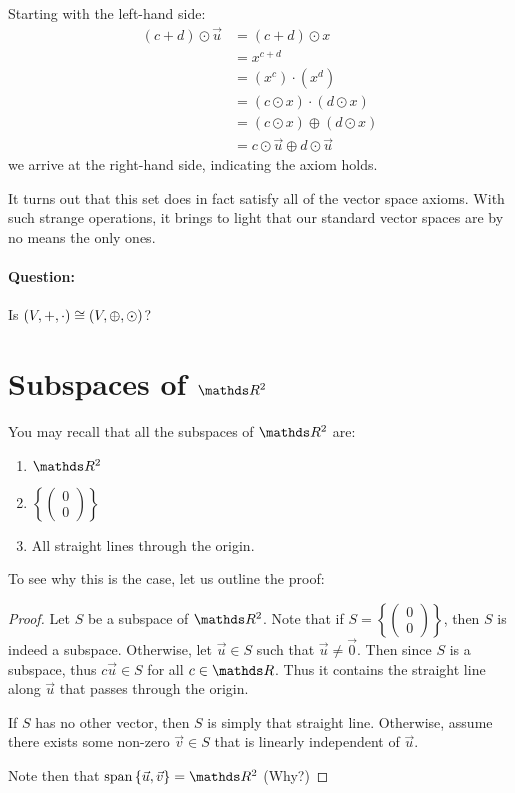 \documentclass[11pt]{article}
\newcommand{\ques}{\paragraph{Question:}}
\newcommand{\vek}[1]{\vec{#1}}
\begin{document}
\begin{enumerate}
{Starting with the left-hand side:
\begin{align*}
(c+d) \odot \vek{u} &= (c+d) \odot x
\\
&= x^{c+d}
\\
&= (x^c) \cdot (x^d)
\\
&= (c \odot x) \cdot (d \odot x)
\\
&= (c \odot x) \oplus (d \odot x)
\\
&= c \odot \vek{u} \oplus d \odot \vek{u}
\end{align*}
we arrive at the right-hand side, indicating the axiom holds.
}
\end{enumerate}
It turns out that this set does in fact satisfy all of the vector space axioms. With such strange operations, it brings to light that our standard vector spaces are by no means the only ones.
\ques Is $(V,+,\cdot) \cong (V, \oplus, \odot)$?

\section*{Subspaces of $\bbR^2$}
You may recall that all the subspaces of $\bbR^2$ are:
\begin{enumerate}
\item{
$\bbR^2$
}
\item{
$\left\{ \begin{pmatrix}0 \\ 0\end{pmatrix} \right\}$
}
\item{
All straight lines through the origin.
}
\end{enumerate}
To see why this is the case, let us outline the proof:
\begin{proof}
Let $S$ be a subspace of $\bbR^2$. Note that if $S = \left\{ \begin{pmatrix}0 \\ 0\end{pmatrix}\right\}$, then $S$ is indeed a subspace. Otherwise, let $\vek{u} \in S$ such that $\vek{u} \neq \vek{0}$. Then since $S$ is a subspace, thus $c \vek{u} \in S$ for all $c \in \bbR$. Thus it contains the straight line along $\vek{u}$ that passes through the origin.

If $S$ has no other vector, then $S$ is simply that straight line. Otherwise, assume there exists some non-zero $\vek{v} \in S$ that is linearly independent of $\vek{u}$.

Note then that $\text{span} \left\{ \vek{u}, \vek{v} \right\} = \bbR^2$ (Why?)
\end{proof}
\end{document}
